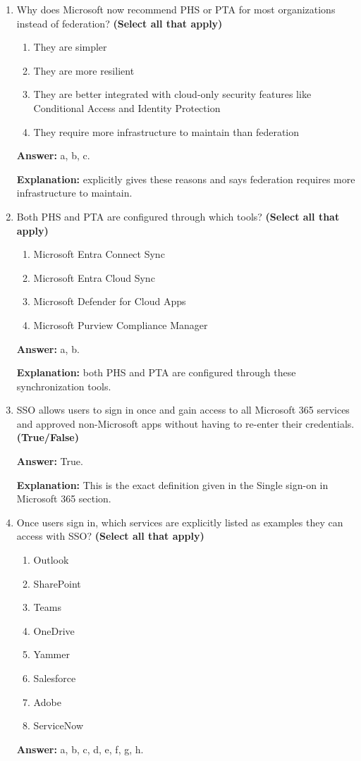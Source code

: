 \documentclass[10pt]{article}
\begin{document}
\begin{enumerate}[leftmargin=*]
\textbf{Explanation:} federation redirects users to an on-premises federation server, which issues a trusted token.

\item Why does Microsoft now recommend PHS or PTA for most organizations instead of federation? \textbf{(Select all that apply)}
\begin{enumerate}[label=\alph*., leftmargin=1.5em]
\item They are simpler
\item They are more resilient
\item They are better integrated with cloud-only security features like Conditional Access and Identity Protection
\item They require more infrastructure to maintain than federation
\end{enumerate}
\textbf{Answer:} a, b, c.

\textbf{Explanation:} explicitly gives these reasons and says federation requires more infrastructure to maintain.

\item Both PHS and PTA are configured through which tools? \textbf{(Select all that apply)}
\begin{enumerate}[label=\alph*., leftmargin=1.5em]
\item Microsoft Entra Connect Sync
\item Microsoft Entra Cloud Sync
\item Microsoft Defender for Cloud Apps
\item Microsoft Purview Compliance Manager
\end{enumerate}
\textbf{Answer:} a, b.

\textbf{Explanation:} both PHS and PTA are configured through these synchronization tools.

\item SSO allows users to sign in once and gain access to all Microsoft 365 services and approved non-Microsoft apps without having to re-enter their credentials. \textbf{(True/False)}

\textbf{Answer:} True.

\textbf{Explanation:} This is the exact definition given in the Single sign-on in Microsoft 365 section.

\item Once users sign in, which services are explicitly listed as examples they can access with SSO? \textbf{(Select all that apply)}
\begin{enumerate}[label=\alph*., leftmargin=1.5em]
\item Outlook
\item SharePoint
\item Teams
\item OneDrive
\item Yammer
\item Salesforce
\item Adobe
\item ServiceNow
\end{enumerate}
\textbf{Answer:} a, b, c, d, e, f, g, h.


\end{enumerate}
\end{document}
